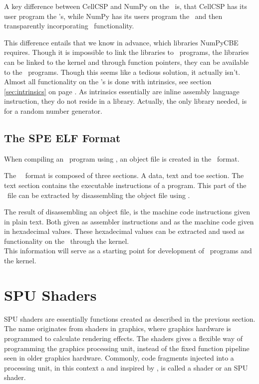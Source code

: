 A key difference between CellCSP and NumPy on the \CBE\ is, that
CellCSP has its user program the \SPE{}'s, while NumPy has its users
program the \PPE\ and then transparently incorporating \SPE\
functionality.

This difference entails that we know in advance, which libraries
NumPyCBE requires. Though it is impossible to link the libraries
to \SPE\ programs, the libraries can be linked to the kernel and
through function pointers, they can be available to the \SPE\
programs. Though this seems like a tedious solution, it actually
isn't. Almost all functionality on the \SPE{}'s is done with
intrinsics, see section \ref{sec:intrinsics} on
page \pageref{sec:intrinsics}. As intrinsics essentially are inline
assembly language instruction, they do not reside in a
library. Actually, the only library needed, is for a random number
generator.

\subsection{The SPE ELF Format}

When compiling an \SPE\ program using , an object
file is created in the \ELF\ format.

The \SPE\ \ELF\ format is composed of three sections. A data, text and
toe section. The text section contains the executable instructions of
a program\cite{elf}. This part of the \ELF\ file can be extracted by
disassembling the object file using \program{spu-objdump}.

The result of disassembling an object file, is the machine code
instructions given in plain text. Both given as assembler instructions
and as the machine code given in hexadecimal values. These hexadecimal
values can be extracted and used as functionality on the \SPE\ through
the kernel.\\

This information will serve as a starting point for development
of \SPE\ programs and the kernel.

\section{SPU Shaders}

SPU shaders are essentially functions created as described in the
previous section. The name originates from shaders in graphics, where
graphics hardware is programmed to calculate rendering effects. The
shaders gives a flexible way of programming the graphics processing
unit, instead of the fixed function pipeline seen in older graphics
hardware. Commonly, code fragments injected into a processing unit, in
this context a \SPU{} and inspired by \cite{spushaders}, is called a
shader or an SPU shader.

